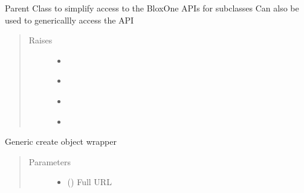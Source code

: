 \documentclass[letterpaper,10pt,english]{sphinxmanual}
\begin{document}
\begin{fulllineitems}
\label{\detokenize{bloxone-class:bloxone.b1}}
\sphinxAtStartPar
Parent Class to simplify access to the BloxOne APIs for subclasses
Can also be used to genericallly access the API
\begin{quote}\begin{description}
\item[{Raises}] \leavevmode\begin{itemize}
\item {} 
\sphinxAtStartPar
{\hyperref[\detokenize{bloxone-class:bloxone.IniFileSectionError}]{}} \textendash{} 

\item {} 
\sphinxAtStartPar
{\hyperref[\detokenize{bloxone-class:bloxone.IniFileKeyError}]{}} \textendash{} 

\item {} 
\sphinxAtStartPar
{\hyperref[\detokenize{bloxone-class:bloxone.APIKeyFormatError}]{}} \textendash{} 

\item {} 
\sphinxAtStartPar
{} \textendash{} 

\end{itemize}

\end{description}\end{quote}

\begin{fulllineitems}
\label{\detokenize{bloxone-class:bloxone.b1.create}}
\sphinxAtStartPar
Generic create object wrapper
\begin{quote}\begin{description}
\item[{Parameters}] \leavevmode\begin{itemize}
\item {} 
\sphinxAtStartPar
{} () \textendash{} Full URL


\end{itemize}
\end{description}
\end{quote}
\end{fulllineitems}
\end{fulllineitems}
\end{document}
